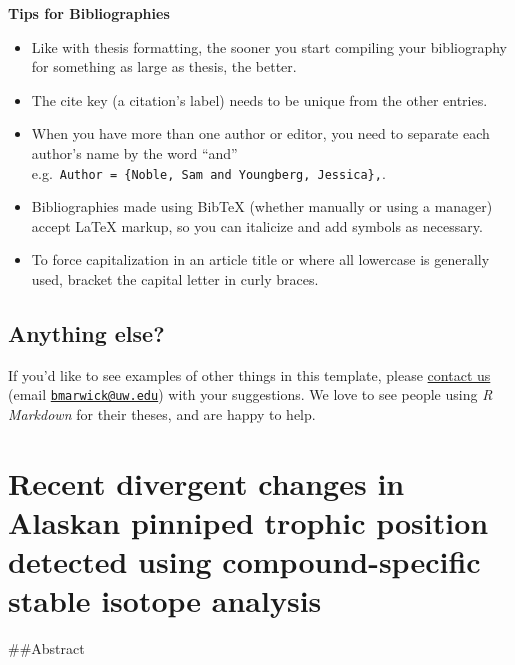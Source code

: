 \documentclass [11pt, proquest] {uwthesis}[2015/03/03]
\providecommand{\tightlist}{%
  \setlength{\itemsep}{0pt}\setlength{\parskip}{0pt}}
\begin{document}
\textbf{Tips for Bibliographies}
\begin{itemize}
\tightlist
\item
  Like with thesis formatting, the sooner you start compiling your bibliography for something as large as thesis, the better.
\item
  The cite key (a citation's label) needs to be unique from the other entries.
\item
  When you have more than one author or editor, you need to separate each author's name by the word ``and'' e.g.~\texttt{Author\ =\ \{Noble,\ Sam\ and\ Youngberg,\ Jessica\},}.
\item
  Bibliographies made using BibTeX (whether manually or using a manager) accept LaTeX markup, so you can italicize and add symbols as necessary.
\item
  To force capitalization in an article title or where all lowercase is generally used, bracket the capital letter in curly braces.
\end{itemize}
\hypertarget{anything-else}{%
\section{Anything else?}\label{anything-else}}

If you'd like to see examples of other things in this template, please \href{https://github.com/benmarwick/huskydown/issues/new}{contact us} (email \href{mailto:bmarwick@uw.edu}{\nolinkurl{bmarwick@uw.edu}}) with your suggestions. We love to see people using \emph{R Markdown} for their theses, and are happy to help.

\hypertarget{recent-divergent-changes-in-alaskan-pinniped-trophic-position-detected-using-compound-specific-stable-isotope-analysis}{%
\chapter{Recent divergent changes in Alaskan pinniped trophic position detected using compound-specific stable isotope analysis}\label{recent-divergent-changes-in-alaskan-pinniped-trophic-position-detected-using-compound-specific-stable-isotope-analysis}}

\#\#Abstract
\end{document}
